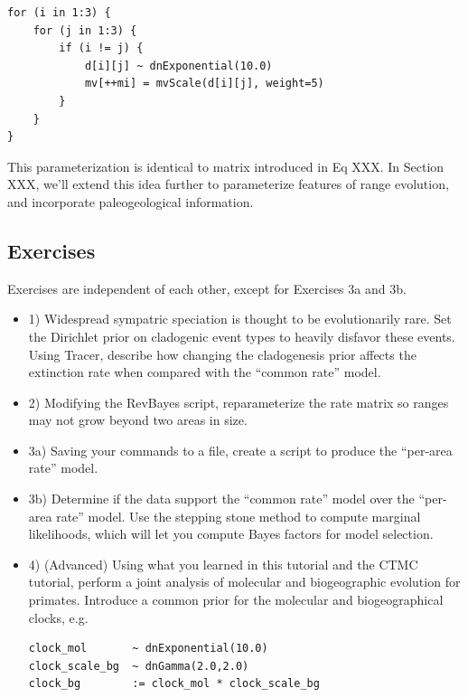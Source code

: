 \begin{snugshade}
\begin{lstlisting}
for (i in 1:3) {
    for (j in 1:3) {
        if (i != j) {
            d[i][j] ~ dnExponential(10.0)
            mv[++mi] = mvScale(d[i][j], weight=5)
        }
    }
}
\end{lstlisting}
\end{snugshade}

This parameterization is identical to matrix introduced in Eq XXX.
In Section XXX, we'll extend this idea further to parameterize features of range evolution, and incorporate paleogeological information.

\subsection{Exercises}

Exercises are independent of each other, except for Exercises 3a and 3b.

\begin{itemize}
\item 1) Widespread sympatric speciation is thought to be evolutionarily rare. Set the Dirichlet prior on cladogenic event types to heavily disfavor these events. Using Tracer, describe how changing the cladogenesis prior affects the extinction rate when compared with the ``common rate'' model.
\item 2) Modifying the RevBayes script, reparameterize the rate matrix so ranges may not grow beyond two areas in size.
\item 3a) Saving your commands to a file, create a script to produce the ``per-area rate'' model.
\item 3b) Determine if the data support the ``common rate'' model over the ``per-area rate'' model. Use the stepping stone method to compute marginal likelihoods, which will let you compute Bayes factors for model selection.
\item 4) (Advanced) Using what you learned in this tutorial and the CTMC tutorial, perform a joint analysis of molecular and biogeographic evolution for primates. Introduce a common prior for the molecular and biogeographical clocks, e.g.
\begin{snugshade}
\begin{lstlisting}
clock_mol       ~ dnExponential(10.0)
clock_scale_bg  ~ dnGamma(2.0,2.0)
clock_bg        := clock_mol * clock_scale_bg
\end{lstlisting}
\end{snugshade}
\end{itemize}

\newpage
